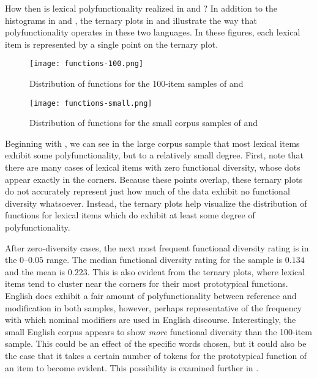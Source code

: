 How then is lexical polyfunctionality realized in  and ? In addition to the histograms in  and , the ternary plots in  and  illustrate the way that polyfunctionality operates in these two languages. In these figures, each lexical item is represented by a single point on the ternary plot.

\begin{figure}[h!]
  \centering
  \caption{Distribution of functions for the 100-item samples of  and }
  \label{fig:ternary-100-items}
  \texttt{[image: functions-100.png]}
\end{figure}

\begin{figure}[h!]
  \centering
  \caption{Distribution of functions for the small corpus samples of  and }
  \label{fig:ternary-small-corpus}
  \texttt{[image: functions-small.png]}
\end{figure}

Beginning with , we can see in the large corpus sample that most lexical items exhibit some polyfunctionality, but to a relatively small degree. First, note that there are many cases of lexical items with zero functional diversity, whose dots appear exactly in the corners. Because these points overlap, these ternary plots do not accurately represent just how much of the data exhibit no functional diversity whatsoever. Instead, the ternary plots help visualize the distribution of functions for lexical items which do exhibit at least some degree of polyfunctionality.

After zero-diversity cases, the next most frequent functional diversity rating is in the $0$–$0.05$ range. The median functional diversity rating for the sample is $0.134$ and the mean is $0.223$. This is also evident from the ternary plots, where lexical items tend to cluster near the corners for their most prototypical functions. English does exhibit a fair amount of polyfunctionality between reference and modification in both samples, however, perhaps representative of the frequency with which nominal modifiers are used in English discourse. Interestingly, the small English corpus appears to show \emph{more} functional diversity than the 100-item sample. This could be an effect of the specific words chosen, but it could also be the case that it takes a certain number of tokens for the prototypical function of an item to become evident. This possibility is examined further in .

